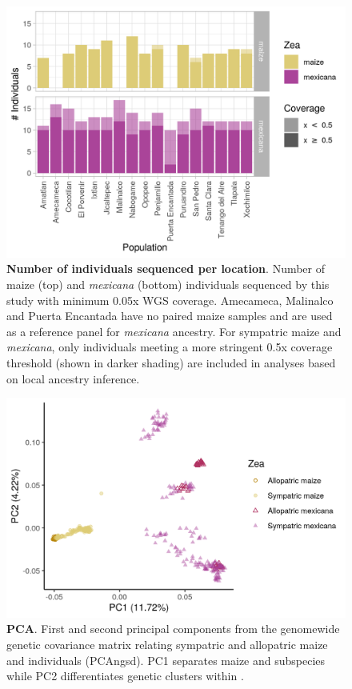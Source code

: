 \begin{figure}[ht]
	\includegraphics[width=\textwidth]{chapter2/figures/p_seq_counts.png}
	\caption{\color{Gray} \textbf{Number of individuals sequenced per location}. Number of maize (top) and \textit{mexicana} (bottom) individuals sequenced by this study with minimum 0.05x WGS coverage. Amecameca, Malinalco and Puerta Encantada have no paired maize samples and are used as a reference panel for \textit{mexicana} ancestry. For sympatric maize and \textit{mexicana}, only individuals meeting a more stringent 0.5x coverage threshold (shown in darker shading) are included in analyses based on local ancestry inference.}
	\label{sequenced_ind_counts}
\end{figure}

\begin{figure}[ht]
\includegraphics[width=\textwidth]{chapter2/figures/HILO_MAIZE55_pca.png}
\caption{\color{Gray} \textbf{PCA}. First and second principal components from the genomewide genetic covariance matrix relating sympatric and allopatric  maize and \mexicana individuals (PCAngsd). PC1 separates maize and \mexicana subspecies while PC2 differentiates genetic clusters within \mexicana.}
\label{pca_maize_mex}
\end{figure}

